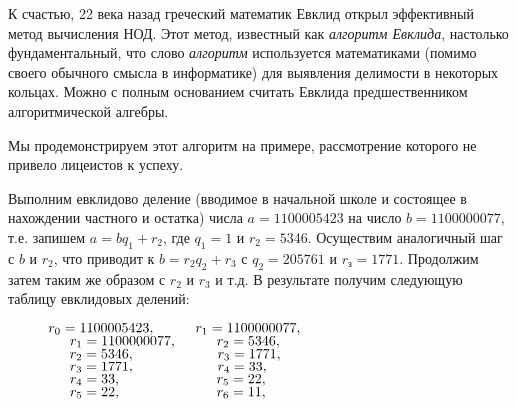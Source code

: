 К счастью, 22 века назад греческий математик Евклид открыл эффективный метод вычисления НОД. Этот метод, известный как {\it алгоритм Евклида}, настолько фундаментальный, что слово {\it алгоритм} используется математиками (помимо своего обычного смысла в информатике) для выявления делимости в некоторых кольцах. Можно с полным основанием считать Евклида предшественником алгоритмической алгебры.

Мы продемонстрируем этот алгоритм на примере, рассмотрение которого не привело лицеистов к успеху. 
\newpage

Выполним евклидово деление (вводимое в начальной школе и состоящее в нахождении частного и остатка) числа $a = 1100 005 423$ на число $b = 1 100 000 077$, т.е. запишем $a = bq_1 + r_2$, где $q_1 = 1$ и $r_2 = 5346$. Осуществим аналогичный шаг с $b$ и $r_2$, что приводит к $b = r_2q_2 + r_3$ с $q_2 = 205 761$ и $r_з = 1771$. Продолжим затем таким же образом с $r_2$ и $r_3$ и т.д. В результате получим следующую таблицу евклидовых делений: 

$\hspace*{1cm} r_0 = 1 100 005 423, \hspace*{1cm}r_1 = 1 100 000 077,$\\ 
$\hspace*{1.54cm} r_1 = 1 100 000 077,\hspace*{1cm} r_2 = 5 346, $\\
$\hspace*{1.54cm} r_2 = 5 346,\hspace*{2.08cm} r_3 = 1 771,$ \\
$\hspace*{1.54cm} r_3 = 1 771,\hspace*{2.08cm} r_4 = 33,$ \\
$\hspace*{1.54cm} r_4 = 33,\hspace*{2.4cm} r_5 = 22, $\\
$\hspace*{1.54cm} r_5 = 22,\hspace*{2.4cm} r_6 = 11,$ \\

